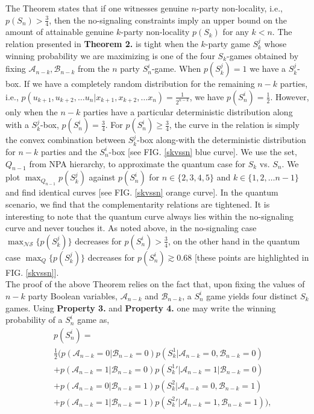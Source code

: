 \documentclass[%
 reprint,
 amsmath,amssymb,
 aps,
]{revtex4-1}
\theoremstyle{plain}
\begin{document}
The Theorem states that if one witnesses genuine $n$-party non-locality, i.e., $p(S_n) > \frac{3}{4}$, then the no-signaling constraints imply an upper bound on the amount of attainable genuine $k$-party non-locality $p(S_k)$ for any $k<n$.  
The relation presented in \textbf{Theorem 2.} is tight when the $k$-party game $S_k^j$ whose winning probability we are maximizing is one of the four $S_k$-games obtained by fixing $\mathcal{A}_{n-k},\mathcal{B}_{n-k}$ from the $n$ party $S_n^i$-game. When $p(S_k^j)=1$ we have a $S_k^j$-box. If we have a completely random distribution for the remaining $n-k$ parties, i.e., $p(u_{k+1},u_{k+2}, \ldots u_n|x_{k+1},x_{k+2}, \ldots x_n)=\frac{1}{2^{n-k}}$, we have $p(S_n^i)=\frac{1}{2}$. However, only when the $n-k$ parties have a particular deterministic distribution along with a $S_k^j$-box, $p(S_n^i)=\frac{3}{4}$. For $p(S_n^i)\ge \frac{3}{4}$, the curve in the relation is simply the convex combination between $S_k^j$-box along-with the deterministic distribution for $n-k$ parties and the $S_n^i$-box [see FIG. \ref{skvssn} blue curve]. We use the set, $Q_{n-1}$ from NPA hierarchy, to approximate the quantum case for $S_k$ vs. $S_n$. We plot  $\max_{Q_{n-1}}p(S_k^j)$ against $p(S_n^i)$ for $n\in \{2,3,4,5\}$ and $k\in \{1,2, \ldots n-1\}$ and find identical curves [see FIG. \ref{skvssn} orange curve]. In the quantum scenario, we find that the complementarity relations are tightened. It is interesting to note that the quantum curve always lies within the no-signaling curve and never touches it. As noted above, in the no-signaling case $\max_{\mathcal{NS}}\{p(S_k^j)\}$ decreases for $p(S_n^i) > \frac{3}{4}$, on the other hand in the quantum case $\max_Q\{p(S_k^j)\}$ decreases for $p(S_n^i) \gtrsim 0.68$ [these points are highlighted in FIG. \ref{skvssn}].\\    
The proof of the above Theorem relies on the fact that, upon fixing the values of  $n-k$ party Boolean variables, $\mathcal{A}_{n-k}$ and $\mathcal{B}_{n-k}$, a $S_n^i$ game yields four distinct $S_k$ games. Using \textbf{Property 3.} and \textbf{Property 4.} one may write the winning probability of a $S_n^i$ game as,
\begin{eqnarray}
\label{general_win_probability2}
&&p({S_n^i}) ={}\nonumber\\&& \frac{1}{2} \bigg( p(\mathcal{A}_{n-k}=0|\mathcal{B}_{n-k}=0)p({S_k^1}|\mathcal{A}_{n-k}=0,\mathcal{B}_{n-k}=0){}\nonumber\\&&+p(\mathcal{A}_{n-k}=1|\mathcal{B}_{n-k}=0)p({S_k^1}'|\mathcal{A}_{n-k}=1|\mathcal{B}_{n-k}=0) \nonumber\\&&
+p(\mathcal{A}_{n-k}=0|\mathcal{B}_{n-k}=1)p({S_k^2}|\mathcal{A}_{n-k}=0,\mathcal{B}_{n-k}=1){}\nonumber\\&&+p(\mathcal{A}_{n-k}=1|\mathcal{B}_{n-k}=1)p({S_k^2}'|\mathcal{A}_{n-k}=1,\mathcal{B}_{n-k}=1) \bigg), \;{}\nonumber\\&& 
\end{eqnarray}
\end{document}
